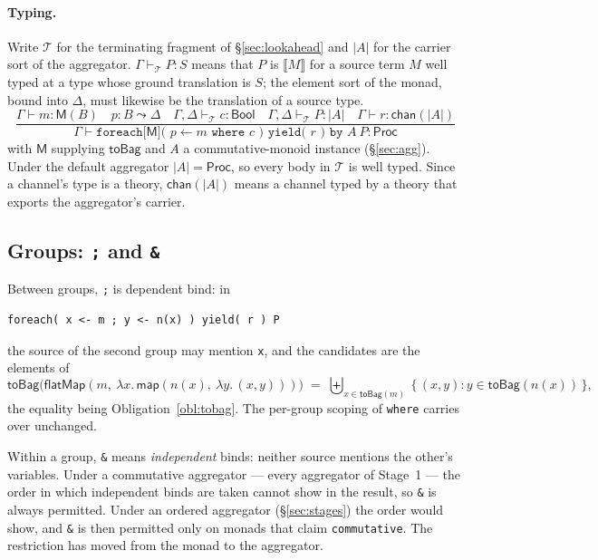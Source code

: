 \documentclass[11pt]{article}
\theoremstyle{definition}
\theoremstyle{plain}
\theoremstyle{remark}
\newcommand{\sem}[1]{\llbracket #1 \rrbracket}
\newcommand{\Proc}{\mathsf{Proc}}
\newcommand{\M}{\mathsf{M}}
\newcommand{\fmap}{\mathsf{map}}
\newcommand{\bind}{\mathsf{flatMap}}
\begin{document}
\paragraph{Typing.} Write \(\mathcal{T}\) for the terminating fragment of
\S\ref{sec:lookahead} and \(|A|\) for the carrier sort of the aggregator.
\(\Gamma \vdash_{\mathcal{T}} P : S\) means that \(P\) is \(\sem{M}\) for a
source term \(M\) well typed at a type whose ground translation is \(S\); the
element sort of the monad, bound into \(\Delta\), must likewise be the
translation of a source type.
\[
\frac{
\Gamma \vdash m : \M(B) \quad
p : B \leadsto \Delta \quad
\Gamma,\Delta \vdash_{\mathcal{T}} c : \textsf{Bool} \quad
\Gamma,\Delta \vdash_{\mathcal{T}} P : |A| \quad
\Gamma \vdash r : \textsf{chan}(|A|)
}{
\Gamma \vdash \texttt{foreach[}\M\texttt{]( } p \leftarrow m \texttt{ where } c \texttt{ ) yield( } r \texttt{ ) by } A\ P : \Proc
}
\]
with \(\M\) supplying \(\mathsf{toBag}\) and \(A\) a commutative-monoid
instance (\S\ref{sec:agg}). Under the default aggregator \(|A| = \Proc\), so
every body in \(\mathcal{T}\) is well typed. Since a channel's type is a
theory, \(\textsf{chan}(|A|)\) means a channel typed by a theory that exports
the aggregator's carrier.

\subsection{Groups: \texttt{;} and \texttt{\&}}
\label{sec:groups}

Between groups, \texttt{;} is dependent bind: in
\begin{lstlisting}
foreach( x <- m ; y <- n(x) ) yield( r ) P
\end{lstlisting}
the source of the second group may mention \texttt{x}, and the candidates are
the elements of
\[
\mathsf{toBag}\big(\bind(m,\ \lambda x.\,\fmap(n(x),\ \lambda y.\,(x,y)))\big)
\;=\;
\textstyle\biguplus_{x \in \mathsf{toBag}(m)}\ \{\, (x,y) : y \in \mathsf{toBag}(n(x)) \,\},
\]
the equality being Obligation~\ref{obl:tobag}. The per-group scoping of
\texttt{where} carries over unchanged.

Within a group, \texttt{\&} means \emph{independent} binds: neither source
mentions the other's variables. Under a commutative aggregator --- every
aggregator of Stage~1 --- the order in which independent binds are taken cannot
show in the result, so \texttt{\&} is always permitted. Under an ordered
aggregator (\S\ref{sec:stages}) the order would show, and \texttt{\&} is then
permitted only on monads that claim \texttt{commutative}. The restriction has
moved from the monad to the aggregator.
\end{document}
